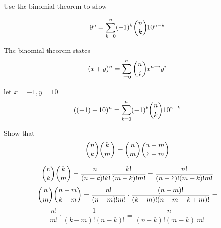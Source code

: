 \documentclass[openany, 12pt]{book}
\begin{document}
\begin{exercise}{}{}
	Use the binomial theorem to show
	\begin{alist}
		\item
		$$9^n=\sum\limits_{k=0}^{n} (-1)^k\dbinom{n}{k}10^{n-k}$$
		\item The binomial theorem states
		$$(x+y)^n=\sum\limits_{i=0}^n\dbinom{n}{i}x^{n-i}y^i$$
		\item let $x=-1, y=10$
		$$((-1)+10)^n=\sum\limits_{k=0}^{n} (-1)^k\dbinom{n}{k}10^{n-k}$$
	\end{alist}
\end{exercise}

\begin{exercise}{}{}
	Show that
	$$
		\dbinom{n}{k}
		\dbinom{k}{m}=
		\dbinom{n}{m}
		\dbinom{n-m}{k-m}
	$$
	\begin{alist}
		\item
		$$
			\dbinom{n}{k}
			\dbinom{k}{m}=
			\dfrac{n!}{(n-k)!k!}
			\dfrac{k!}{(m-k)!m!}=
			\dfrac{n!}{(n-k)!(m-k)!m!}
		$$
		$$
			\dbinom{n}{m}
			\dbinom{n-m}{k-m}=
			\dfrac{n!}{(n-m)!m!}\cdot
			\dfrac{(n-m)!}{(k-m)!(n-m-k+m)!}=
		$$
		$$
			\dfrac{n!}{m!}\cdot
			\dfrac{1}{(k-m)!(n-k)!}=\dfrac{n!}{(n-k)!(m-k)!m!}
		$$
	\end{alist}
\end{exercise}
\end{document}

